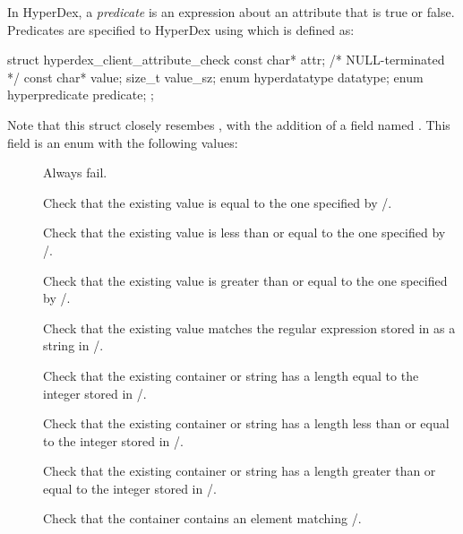 In HyperDex, a {\em predicate} is an expression about an attribute that is true
or false.  Predicates are specified to HyperDex using  which is defined as:

\begin{ccode}
struct hyperdex_client_attribute_check
{
    const char* attr; /* NULL-terminated */
    const char* value;
    size_t value_sz;
    enum hyperdatatype datatype;
    enum hyperpredicate predicate;
};
\end{ccode}

Note that this struct closely resembes , with the addition of a field named
.  This field is an enum with the following values:

\begin{description}
\item[] Always fail.
\item[] Check that the existing value is equal to
    the one specified by /.
\item[] Check that the existing value is less
    than or equal to the one specified by /.
\item[] Check that the existing value is
    greater than or equal to the one specified by /.
\item[] Check that the existing value matches the
    regular expression stored in as a string in /.
\item[] Check that the existing container
    or string has a length equal to the integer stored in
    /.
\item[] Check that the existing
    container or string has a length less than or equal to the integer stored in
    /.
\item[] Check that the existing
    container or string has a length greater than or equal to the integer stored
    in /.
\item[] Check that the container contains an
    element matching /.
\end{description}

